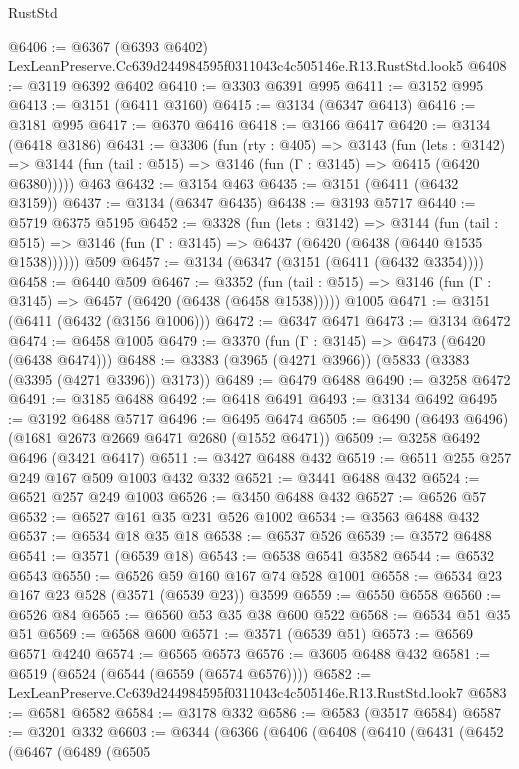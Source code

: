 \begin{lexlean}{RustStd}
\begin{coremodule}
@6406 := @6367 (@6393 @6402) LexLeanPreserve.Cc639d244984595f0311043c4c505146e.R13.RustStd.look5
@6408 := @3119 @6392 @6402
@6410 := @3303 @6391 @995
@6411 := @3152 @995
@6413 := @3151 (@6411 @3160)
@6415 := @3134 (@6347 @6413)
@6416 := @3181 @995
@6417 := @6370 @6416
@6418 := @3166 @6417
@6420 := @3134 (@6418 @3186)
@6431 := @3306
    (fun (rty : @405) =>
    @3143
      (fun (lets : @3142) =>
      @3144 (fun (tail : @515) => @3146 (fun (Γ : @3145) => @6415 (@6420 @6380)))))
    @463
@6432 := @3154 @463
@6435 := @3151 (@6411 (@6432 @3159))
@6437 := @3134 (@6347 @6435)
@6438 := @3193 @5717
@6440 := @5719 @6375 @5195
@6452 := @3328
    (fun (lets : @3142) =>
    @3144
      (fun (tail : @515) => @3146 (fun (Γ : @3145) => @6437 (@6420 (@6438 (@6440 @1535 @1538))))))
    @509
@6457 := @3134 (@6347 (@3151 (@6411 (@6432 @3354))))
@6458 := @6440 @509
@6467 := @3352
    (fun (tail : @515) => @3146 (fun (Γ : @3145) => @6457 (@6420 (@6438 (@6458 @1538)))))
    @1005
@6471 := @3151 (@6411 (@6432 (@3156 @1006)))
@6472 := @6347 @6471
@6473 := @3134 @6472
@6474 := @6458 @1005
@6479 := @3370 (fun (Γ : @3145) => @6473 (@6420 (@6438 @6474)))
@6488 := @3383 (@3965 (@4271 @3966)) (@5833 (@3383 (@3395 (@4271 @3396)) @3173))
@6489 := @6479 @6488
@6490 := @3258 @6472
@6491 := @3185 @6488
@6492 := @6418 @6491
@6493 := @3134 @6492
@6495 := @3192 @6488 @5717
@6496 := @6495 @6474
@6505 := @6490 (@6493 @6496) (@1681 @2673 @2669 @6471 @2680 (@1552 @6471))
@6509 := @3258 @6492 @6496 (@3421 @6417)
@6511 := @3427 @6488 @432
@6519 := @6511 @255 @257 @249 @167 @509 @1003 @432 @332
@6521 := @3441 @6488 @432
@6524 := @6521 @257 @249 @1003
@6526 := @3450 @6488 @432
@6527 := @6526 @57
@6532 := @6527 @161 @35 @231 @526 @1002
@6534 := @3563 @6488 @432
@6537 := @6534 @18 @35 @18
@6538 := @6537 @526
@6539 := @3572 @6488
@6541 := @3571 (@6539 @18)
@6543 := @6538 @6541 @3582
@6544 := @6532 @6543
@6550 := @6526 @59 @160 @167 @74 @528 @1001
@6558 := @6534 @23 @167 @23 @528 (@3571 (@6539 @23)) @3599
@6559 := @6550 @6558
@6560 := @6526 @84
@6565 := @6560 @53 @35 @38 @600 @522
@6568 := @6534 @51 @35 @51
@6569 := @6568 @600
@6571 := @3571 (@6539 @51)
@6573 := @6569 @6571 @4240
@6574 := @6565 @6573
@6576 := @3605 @6488 @432
@6581 := @6519 (@6524 (@6544 (@6559 (@6574 @6576))))
@6582 := LexLeanPreserve.Cc639d244984595f0311043c4c505146e.R13.RustStd.look7
@6583 := @6581 @6582
@6584 := @3178 @332
@6586 := @6583 (@3517 @6584)
@6587 := @3201 @332
@6603 := @6344
    (@6366
      (@6406
        (@6408
          (@6410
            (@6431
              (@6452
                (@6467
                  (@6489
                    (@6505

\end{coremodule}
\end{lexlean}
